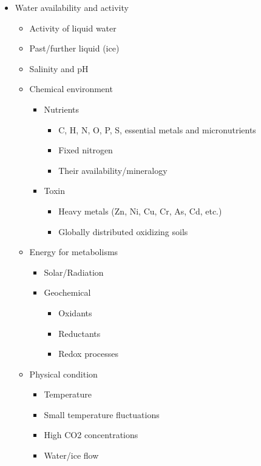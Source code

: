 \begin{itemize}
  \item Water availability and activity
  \begin{itemize}
    \item Activity of liquid water
    \item Past/further liquid (ice)
    \item Salinity and pH
  \end{itemize}
  \begin{itemize}
    \item  Chemical environment
    \begin{itemize}
      \item Nutrients
      \begin{itemize}
        \item C, H, N, O, P, S, essential metals and micronutrients
        \item Fixed nitrogen
        \item Their availability/mineralogy
      \end{itemize}
      \item Toxin
      \begin{itemize}
        \item Heavy metals (Zn, Ni, Cu, Cr, As, Cd, etc.)
        \item Globally distributed oxidizing soils
      \end{itemize}
    \end{itemize}
  \end{itemize}
  \begin{itemize}
    \item  Energy for metabolisms
    \begin{itemize}
      \item Solar/Radiation
      \item Geochemical
      \begin{itemize}
        \item Oxidants
        \item Reductants
        \item Redox processes
      \end{itemize}
    \end{itemize}
  \end{itemize}
  \begin{itemize}
    \item Physical condition
    \begin{itemize}
      \item Temperature
      \item Small temperature fluctuations
      \item High CO2 concentrations
      \item Water/ice flow
    \end{itemize}
  \end{itemize}
\end{itemize}

